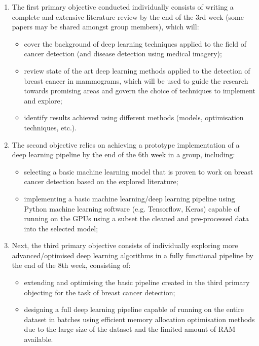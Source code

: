 \begin{enumerate}
    \item The first primary objective conducted individually consists of writing a complete and extensive literature review by the end of the 3rd week (some papers may be shared amongst group members), which will:
    \begin{itemize}
        \item cover the background of deep learning techniques applied to the field of cancer detection (and disease detection using medical imagery);
        \item review state of the art deep learning methods applied to the detection of breast cancer in mammograms, which will be used to guide the research towards promising areas and govern the choice of techniques to implement and explore;
        \item identify results achieved using different methods (models, optimisation techniques, etc.).
    \end{itemize}
    \item The second objective relies on achieving a prototype implementation of a deep learning pipeline by the end of the 6th week in a group, including:
    \begin{itemize}
        \item selecting a basic machine learning model that is proven to work on breast cancer detection based on the explored literature;
        \item implementing a basic machine learning/deep learning pipeline using Python machine learning software (e.g. Tensorflow, Keras) capable of running on the GPUs using a subset the cleaned and pre-processed data into the selected model;
    \end{itemize}
    \item Next, the third primary objective consists of individually exploring more advanced/optimised deep learning algorithms in a fully functional pipeline by the end of the 8th week, consisting of:
    \begin{itemize}
        \item extending and optimising the basic pipeline created in the third primary objecting for the task of breast cancer detection;
        \item designing a full deep learning pipeline capable of running on the entire dataset in batches using efficient memory allocation optimisation methods due to the large size of the dataset and the limited amount of RAM available.
    \end{itemize}

\end{enumerate}
